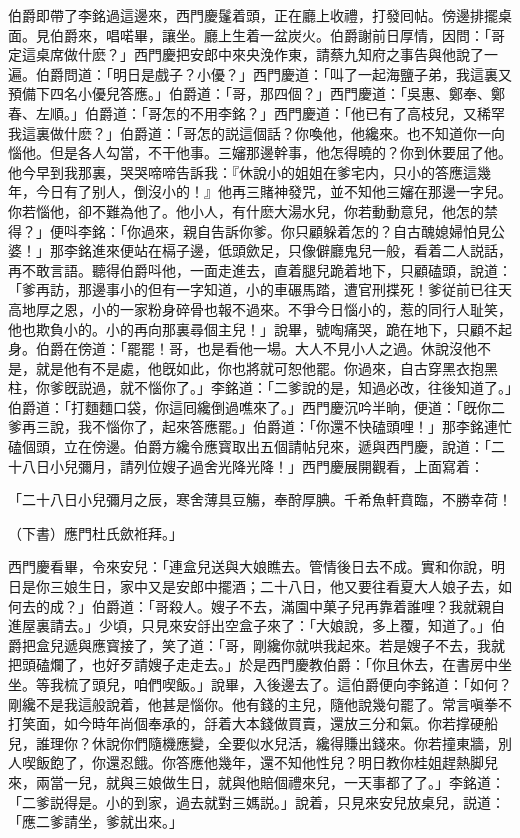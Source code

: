 伯爵即帶了李銘過這邊來，西門慶鬔着頭，正在廳上收禮，打發囘帖。傍邊排擺桌面。見伯爵來，唱喏畢，讓坐。廳上生着一盆炭火。伯爵謝前日厚情，因問：「哥定這桌席做什麽？」西門慶把安郎中來央浼作東，請蔡九知府之事告與他說了一遍。伯爵問道：「明日是戲子？小優？」西門慶道：「叫了一起海鹽子弟，我這裏又預備下四名小優兒答應。」伯爵道：「哥，那四個？」西門慶道：「吳惠、鄭奉、鄭春、左順。」伯爵道：「哥怎的不用李銘？」西門慶道：「他已有了高枝兒，又稀罕我這裏做什麽？」伯爵道：「哥怎的説這個話？你喚他，他纔來。也不知道你一向惱他。但是各人勾當，不干他事。三嬸那邊幹事，他怎得曉的？你到休要屈了他。他今早到我那裏，哭哭啼啼告訴我：『休說小的姐姐在爹宅内，只小的答應這幾年，今日有了别人，倒沒小的！』他再三賭神發咒，並不知他三嬸在那邊一字兒。你若惱他，卻不難為他了。他小人，有什麽大湯水兒，你若動動意兒，他怎的禁得？」便呌李銘：「你過來，親自告訴你爹。你只顧躲着怎的？自古醜媳婦怕見公婆！」那李銘進來便站在槅子邊，低頭歛足，只像僻廳鬼兒一般，看着二人説話，再不敢言語。聽得伯爵呌他，一面走進去，直着腿兒跪着地下，只顧磕頭，說道：「爹再訪，那邊事小的但有一字知道，小的車碾馬踏，遭官刑揲死！爹従前已往天高地厚之恩，小的一家粉身碎骨也報不過來。不爭今日惱小的，惹的同行人耻笑，他也欺負小的。小的再向那裏尋個主兒！」說畢，號啕痛哭，跪在地下，只顧不起身。伯爵在傍道：「罷罷！哥，也是看他一場。大人不見小人之過。休說沒他不是，就是他有不是處，他旣如此，你也將就可恕他罷。你過來，自古穿黑衣抱黑柱，你爹旣説過，就不惱你了。」李銘道：「二爹說的是，知過必改，往後知道了。」伯爵道：「打麵麵口袋，你這囘纔倒過噍來了。」西門慶沉吟半晌，便道：「旣你二爹再三說，我不惱你了，起來答應罷。」伯爵道：「你還不快磕頭哩！」那李銘連忙磕個頭，立在傍邊。伯爵方纔令應寳取出五個請帖兒來，遞與西門慶，說道：「二十八日小兒彌月，請列位嫂子過舍光降光降！」西門慶展開觀看，上面寫着：

\begin{myquote}
「二十八日小兒彌月之辰，寒舍薄具豆觴，奉酧厚腆。千希魚軒賁臨，不勝幸荷！

\begin{flushright}{\marktext（下書）}應門杜氏歛袵拜。」\end{flushright}
\end{myquote}

西門慶看畢，令來安兒：「連盒兒送與大娘瞧去。管情後日去不成。實和你說，明日是你三娘生日，家中又是安郎中擺酒；二十八日，他又要往看夏大人娘子去，如何去的成？」伯爵道：「哥殺人。嫂子不去，滿園中菓子兒再靠着誰哩？我就親自進屋裏請去。」少頃，只見來安㧱出空盒子來了：「大娘說，多上覆，知道了。」伯爵把盒兒遞與應寳接了，笑了道：「哥，剛纔你就哄我起來。若是嫂子不去，我就把頭磕爛了，也好歹請嫂子走走去。」於是西門慶教伯爵：「你且休去，在書房中坐坐。等我梳了頭兒，咱們喫飯。」說畢，入後邊去了。這伯爵便向李銘道：「如何？剛纔不是我這般說着，他甚是惱你。他有錢的主兒，隨他說幾句罷了。常言嗔拳不打笑面，如今時年尚個奉承的，㧱着大本錢做買賣，還放三分和氣。你若撑硬船兒，誰理你？休說你們隨機應變，全要似水兒活，纔得賺出錢來。你若撞東牆，別人喫飯飽了，你還忍餓。你答應他幾年，還不知他性兒？明日教你桂姐趕熱脚兒來，兩當一兒，就與三娘做生日，就與他賠個禮來兒，一天事都了了。」李銘道：「二爹説得是。小的到家，過去就對三媽説。」說着，只見來安兒放桌兒，説道：「應二爹請坐，爹就出來。」

